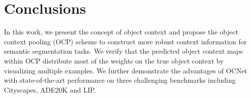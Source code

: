 \documentclass[10pt,twocolumn,letterpaper]{article}
\begin{document}

\section{Conclusions}

In this work,
we present the concept of object context
and propose the object context pooling (OCP) scheme
to construct more robust context information for semantic segmentation tasks.
We verify that the predicted object context maps
within OCP distribute most of the weights on the true object context
by visualizing multiple examples.
We further demonstrate the advantages of OCNet
with state-of-the-art performance on three challenging benchmarks
including Cityscapes, ADE20K and LIP.


{\small


}
\end{document}
